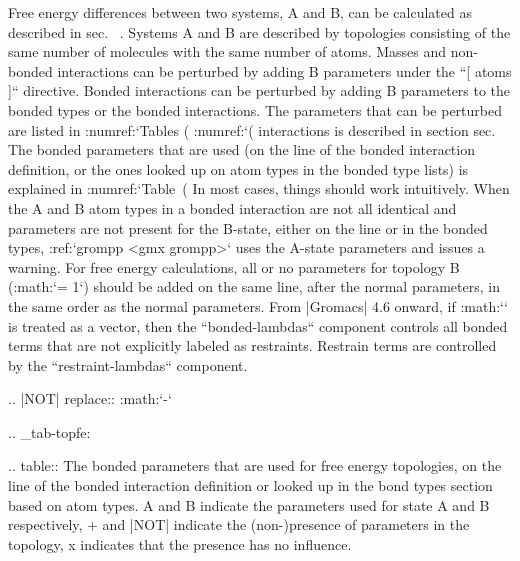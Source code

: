 Free energy differences
between two systems, A and B, can be calculated as described in
sec. 
. Systems A and B are described by
topologies consisting of the same number of molecules with the same
number of atoms. Masses and non-bonded interactions can be perturbed by
adding B parameters under the ``[ atoms ]`` directive.
Bonded interactions can be perturbed by adding B parameters to the
bonded types or the bonded interactions. The parameters that can be
perturbed are listed in :numref:`Tables (%
:numref:`(%
interactions is described in section sec.
The bonded parameters that are used (on the line of the bonded
interaction definition, or the ones looked up on atom types in the
bonded type lists) is explained in :numref:`Table (%
In most cases, things should work intuitively. When the A and B atom
types in a bonded interaction are not all identical and parameters are
not present for the B-state, either on the line or in the bonded types,
:ref:`grompp <gmx grompp>` uses the A-state parameters and issues a warning.
For free energy calculations, all or no parameters for topology B
(:math:`\lambda = 1`) should be added on the same line, after the normal
parameters, in the same order as the normal parameters. From |Gromacs| 4.6
onward, if :math:`\lambda` is treated as a vector, then the
``bonded-lambdas`` component controls all bonded terms that
are not explicitly labeled as restraints. Restrain terms are controlled
by the ``restraint-lambdas`` component.

.. |NOT| replace:: :math:`-`

.. _tab-topfe:

.. table:: The bonded parameters that are used for free energy topologies,
           on the line of the bonded interaction definition or looked up
           in the bond types section based on atom types. A and B indicate the
           parameters used for state A and B respectively, + and |NOT| indicate
           the (non-)presence of parameters in the topology, x indicates that
           the presence has no influence.

